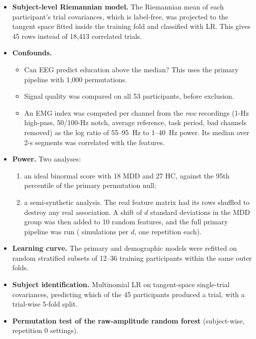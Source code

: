 \begin{itemize}
        rate, per-emotion medians and the sad$-$happy difference. This behavioural model uses no EEG and no
        questionnaire.
  \item \textbf{Subject-level Riemannian model.} The Riemannian mean of each participant's trial covariances, which
        is label-free, was projected to the tangent space fitted inside the training fold and classified with LR.
        This gives 45 rows instead of 18{,}413 correlated trials.
  \item \textbf{Confounds.}
        \begin{itemize}
          \item Can EEG predict education above the median? This uses the primary pipeline with 1{,}000 permutations.
          \item Signal quality was compared on all 53 participants, before exclusion.
          \item An EMG index was computed per channel from the \emph{raw} recordings (1-Hz high-pass, 50/100-Hz
                notch, average reference, task period, bad channels removed) as the log ratio of 55--95~Hz to
                1--40~Hz power. Its median over 2-s segments was correlated with the features.
        \end{itemize}
  \item \textbf{Power.} Two analyses:
        \begin{enumerate}
          \item an ideal binormal score with 18 MDD and 27 HC, against the 95th percentile of the primary
                permutation null;
          \item a semi-synthetic analysis. The real feature matrix had its rows shuffled to destroy any real
                association. A shift of $d$ standard deviations in the MDD group was then added to 10 random features,
                and the full primary pipeline was run (\AudSemiNsims{} simulations per $d$, one repetition each).
        \end{enumerate}
  \item \textbf{Learning curve.} The primary and demographic models were refitted on random stratified subsets of
        12--36 training participants within the same outer folds.
  \item \textbf{Subject identification.} Multinomial LR on tangent-space single-trial covariances, predicting which
        of the 45 participants produced a trial, with a trial-wise 5-fold split.
  \item \textbf{Permutation test of the raw-amplitude random forest} (subject-wise, repetition 0 settings).
\end{itemize}
